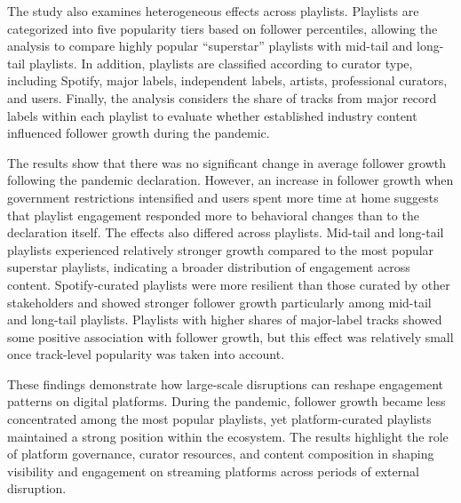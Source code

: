 The study also examines heterogeneous effects across playlists. Playlists are categorized into five popularity tiers based on follower percentiles, allowing the analysis to compare highly popular “superstar” playlists with mid-tail and long-tail playlists. In addition, playlists are classified according to curator type, including Spotify, major labels, independent labels, artists, professional curators, and users. Finally, the analysis considers the share of tracks from major record labels within each playlist to evaluate whether established industry content influenced follower growth during the pandemic.

The results show that there was no significant change in average follower growth following the pandemic declaration. However, an increase in follower growth when government restrictions intensified and users spent more time at home suggests that playlist engagement responded more to behavioral changes than to the declaration itself. The effects also differed across playlists. Mid-tail and long-tail playlists experienced relatively stronger growth compared to the most popular superstar playlists, indicating a broader distribution of engagement across content. Spotify-curated playlists were more resilient than those curated by other stakeholders and showed stronger follower growth particularly among mid-tail and long-tail playlists. Playlists with higher shares of major-label tracks showed some positive association with follower growth, but this effect was relatively small once track-level popularity was taken into account.

These findings demonstrate how large-scale disruptions can reshape engagement patterns on digital platforms. During the pandemic, follower growth became less concentrated among the most popular playlists, yet platform-curated playlists maintained a strong position within the ecosystem. The results highlight the role of platform governance, curator resources, and content composition in shaping visibility and engagement on streaming platforms across periods of external disruption.




